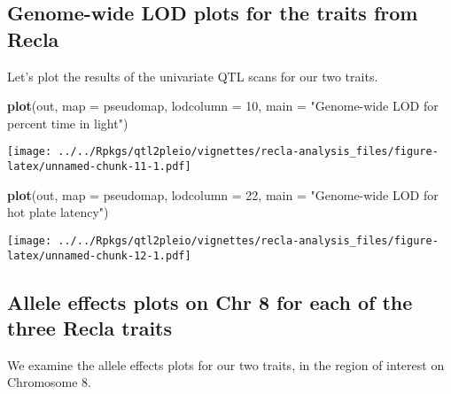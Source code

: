 \documentclass[oneside]{book}
\newenvironment{Shaded}{\begin{snugshade}}{\end{snugshade}}
\newcommand{\DataTypeTok}[1]{\textcolor[rgb]{0.13,0.29,0.53}{#1}}
\newcommand{\DecValTok}[1]{\textcolor[rgb]{0.00,0.00,0.81}{#1}}
\newcommand{\KeywordTok}[1]{\textcolor[rgb]{0.13,0.29,0.53}{\textbf{#1}}}
\newcommand{\NormalTok}[1]{#1}
\newcommand{\StringTok}[1]{\textcolor[rgb]{0.31,0.60,0.02}{#1}}
\begin{document}
\hypertarget{genome-wide-lod-plots-for-the-traits-from-recla}{%
\subsection{Genome-wide LOD plots for the traits from
Recla}\label{genome-wide-lod-plots-for-the-traits-from-recla}}

Let's plot the results of the univariate QTL scans for our two traits.

\begin{Shaded}
\begin{Highlighting}[]
\KeywordTok{plot}\NormalTok{(out, }\DataTypeTok{map =}\NormalTok{ pseudomap, }\DataTypeTok{lodcolumn =} \DecValTok{10}\NormalTok{, }\DataTypeTok{main =} \StringTok{"Genome-wide LOD for percent time in light"}\NormalTok{)}
\end{Highlighting}
\end{Shaded}

\texttt{[image: ../../Rpkgs/qtl2pleio/vignettes/recla-analysis\_files/figure-latex/unnamed-chunk-11-1.pdf]}

\begin{Shaded}
\begin{Highlighting}[]
\KeywordTok{plot}\NormalTok{(out, }\DataTypeTok{map =}\NormalTok{ pseudomap, }\DataTypeTok{lodcolumn =} \DecValTok{22}\NormalTok{, }\DataTypeTok{main =} \StringTok{"Genome-wide LOD for hot plate latency"}\NormalTok{)}
\end{Highlighting}
\end{Shaded}

\texttt{[image: ../../Rpkgs/qtl2pleio/vignettes/recla-analysis\_files/figure-latex/unnamed-chunk-12-1.pdf]}

\hypertarget{allele-effects-plots-on-chr-8-for-each-of-the-three-recla-traits}{%
\subsection{Allele effects plots on Chr 8 for each of the three Recla
traits}\label{allele-effects-plots-on-chr-8-for-each-of-the-three-recla-traits}}

We examine the allele effects plots for our two traits, in the region of
interest on Chromosome 8.
\end{document}
